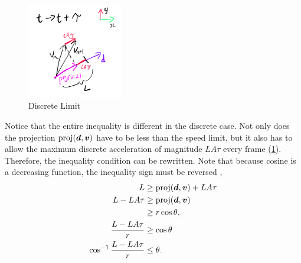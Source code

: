 \begin{figure}
    \includegraphics[width=0.37\textwidth,right]{assets/discrete_limit.png}
    \caption{Discrete Limit}
    \label{fig:discrete_limit}
\end{figure}
Notice that the entire inequality is different in the discrete case. Not only does the projection $\text{proj}(\boldsymbol{d}, \boldsymbol{v})$ have to be less than the speed limit, but it also has to allow the maximum discrete acceleration of magnitude $LA\tau$ every frame (\ref{fig:discrete_limit}). Therefore, the inequality condition can be rewritten. Note that because cosine is a decreasing function, the inequality sign must be reversed \parencite{ineqcosine},
\begin{align*}
    L &\ge \text{proj}(\boldsymbol{d}, \boldsymbol{v}) + LA\tau\\
    L - LA\tau &\ge \text{proj}(\boldsymbol{d}, \boldsymbol{v})\\
    &\ge r \cos \theta,\\
    \frac{L - LA\tau}{r} &\ge \cos \theta\\
    \cos^{-1} \frac{L - LA\tau}{r} &\le \theta.
\end{align*}

